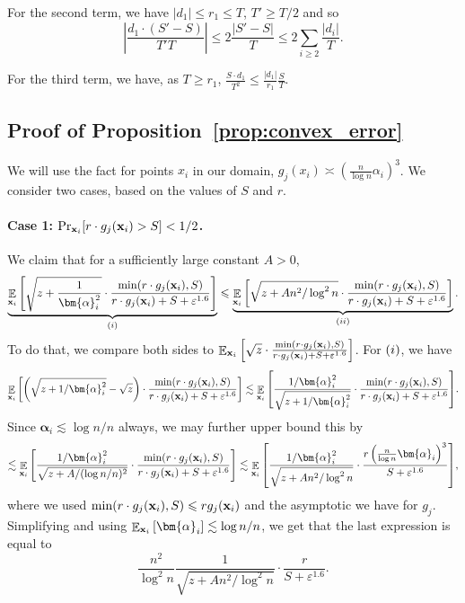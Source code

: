 \documentclass[10pt,a4paper]{article}
\newcommand\E{\mathop{\mathbb{E}}}
\newcommand\card[1]{\left| {#1} \right|}
\newcommand\Expect[2]{{\mathop{\mathbb{E}}_{#1}\left[ {#2} \right]}}
\renewcommand\geq{\geqslant}
\renewcommand\leq{\leqslant}
\newcommand{\rom}[1]{\uppercase\expandafter{\romannumeral #1\relax}}
\newcommand{\al}{\alpha}
\newcommand{\ve}{\varepsilon}
\def\ll{\lesssim}
\def\ee{\asymp}
\begin{document}
For the second term, we have $\card{d_1}\leq r_1\leq T$, $T'\geq T/2$ and so
\[
\card{\frac{d_1\cdot (S'-S)}{T'T}}
\leq 2\frac{\card{S'-S}}{T}
\leq 2\sum\limits_{i\geq 2}{\frac{\card{d_i}}{T}}.
\]

For the third term, we have, as $T\geq r_1$,
$\frac{ S\cdot d_1}{T^2}
\leq \frac{\card{d_1}}{r_1}\frac{S}{T}$.

\subsection{Proof of Proposition~\ref{prop:convex_error}}
	We will use the fact for points $x_i$ in our domain, $g_j(x_i) \ee \left(\frac{n}{\log n}\alpha_i\right)^3$.
	We consider two cases, based on the values of $S$ and $r$.
	\paragraph{Case 1: $\Pr_{{\bf x}_i} [r\cdot g_j({\bf x}_i)>S] < 1/2$.}
    We claim that for a sufficiently large constant $A>0$,
		\begin{equation*}
	\underbrace{\Expect{{\bf x}_i}{\sqrt{z+\frac{1}{\bm{\al}_i^2}} \cdot\frac{\min(r\cdot g_j({\bf x}_i),S)}
	{r\cdot g_j({\bf x}_i)+S+\ve^{1.6}}}}_{(\rom{1})}
    \leq
	\underbrace{\E_{{\bf x}_i}\left[ \sqrt{z+An^2/\log^2 n} \cdot \frac{\min(r\cdot g_j({\bf x}_i),S)}
	{r\cdot g_j({\bf x}_i)+S+\ve^{1.6}}  \right]}_{(\rom{2})}
    .
	\end{equation*}
	To do that, we compare both sides to $\Expect{{\bf x}_i}{\sqrt{z} \cdot\frac{\min(r\cdot g_j({\bf x}_i),S)}{r\cdot g_j({\bf x}_i)+S+\ve^{1.6}}} $.	
	For $(\rom{1})$, we have
    \[
	\Expect{{\bf x}_i}{\left(\sqrt{z+1/\bm{\al}_i^2} -\sqrt{z}\right)\cdot \frac{\min(r\cdot g_j({\bf x}_i),S)}
	{r\cdot g_j({\bf x}_i)+S+\ve^{1.6}}}
    \ll \Expect{{\bf x}_i}{\frac{1/\bm{\alpha}_i^2}{\sqrt{z+1/\bm{\al}_i^2}}\cdot \frac{\min(r\cdot g_j({\bf x}_i),S)}
	{r\cdot g_j({\bf x}_i)+S+\ve^{1.6}}}.
	\]
    Since $\bm{\alpha}_i\ll \log n/n$ always, we may further upper bound this by
    \[
    \ll \Expect{{\bf x}_i}{\frac{1/\bm{\alpha}_i^2}{\sqrt{z+A/(\log n/n)^2}}\cdot \frac{\min(r\cdot g_j({\bf x}_i),S)}
	{r\cdot g_j({\bf x}_i)+S+\ve^{1.6}}}
    \ll \Expect{{\bf x}_i}{\frac{1/\bm{\alpha}_i^2}{\sqrt{z+An^2/\log^2 n}}\cdot \frac{r\left(\frac{n}{\log n}\bm{\al}_i\right)^3}
	{S+\ve^{1.6}}},
	\]
    where we used $\min(r\cdot g_j({\bf x}_i),S)\leq rg_j({\bf x}_i)$ and the asymptotic we have for $g_j$. Simplifying and using
    $\Expect{{\bf x}_i}{\bm{\alpha}_i}\ll \log n/n$, we get that the last expression is equal to
    \[
    \frac{n^2}{\log^2 n}\frac{1}{\sqrt{z+An^2/\log^2 n}}\cdot \frac{r}{S+\ve^{1.6}}.
    \]
\end{document}
